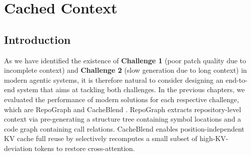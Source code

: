 \chapter{Cached Context}
\label{cha:ch3}


\section{Introduction}
\label{sec:ch3_intro}

As we have identified the existence of \textbf{Challenge 1} (poor patch quality due to incomplete context) and \textbf{Challenge 2} (slow generation due to long context) in modern agentic systems, it is therefore natural to consider designing an end-to-end system that aims at tackling both challenges. In the previous chapters, we evaluated the performance of modern solutions for each respective challenge, which are RepoGraph \cite{ouyang2025repographenhancingaisoftware} and CacheBlend \cite{yao2025cacheblendfastlargelanguage}. RepoGraph extracts repository-level context via pre-generating a structure tree containing symbol locations and a code graph containing call relations. CacheBlend enables position-independent KV cache full reuse by selectively recomputes a small subset of high-KV-deviation tokens to restore cross-attention.